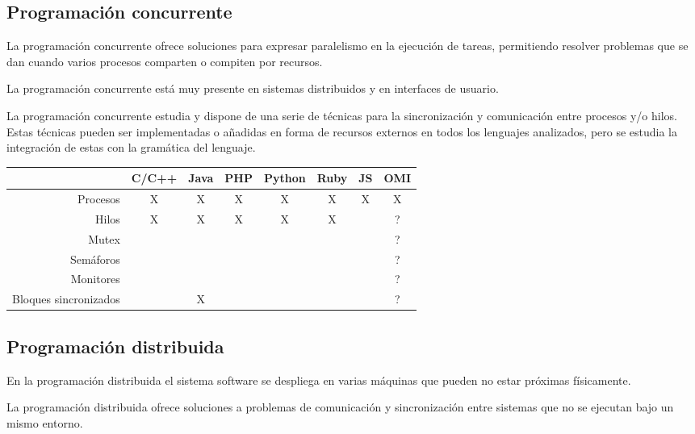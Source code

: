 \subsection{Programación concurrente}
La programación concurrente ofrece soluciones para expresar paralelismo en la ejecución de 
tareas, permitiendo resolver problemas que se dan cuando varios procesos comparten o compiten
por recursos.

La programación concurrente está muy presente en sistemas distribuidos y en interfaces de
usuario.

La programación concurrente estudia y dispone de una serie de técnicas para la sincronización 
y comunicación entre procesos y/o hilos. Estas técnicas pueden ser implementadas o añadidas en forma de recursos externos en todos los lenguajes analizados, pero se estudia la integración de estas con la gramática del lenguaje.

\FloatBarrier
\begin{table}[h]
\begin{center}
 
\begin{tabular}{|r|c|c|c|c|c|c|c|} \hline
 & C/C++ & Java & PHP  & Python & Ruby & JS & OMI\\ \hline
Procesos & X & X & X & X & X  & X & X \\ \hline
Hilos & X & X & X & X & X &  & ? \\ \hline
Mutex &  & &  &  & &  & ? \\ \hline
Semáforos &  & &  &  & &  & ? \\ \hline
Monitores & & & & & &  & ? \\ \hline
Bloques sincronizados & & X  & & & &  & ? \\ \hline
\end{tabular}
\end{center}
\end{table}
\FloatBarrier



\subsection{Programación distribuida}
En la programación distribuida el sistema software se despliega 
en varias máquinas que pueden no estar próximas físicamente.  

La programación distribuida ofrece soluciones a problemas de 
comunicación y sincronización entre sistemas que no se
ejecutan bajo un mismo entorno. 

